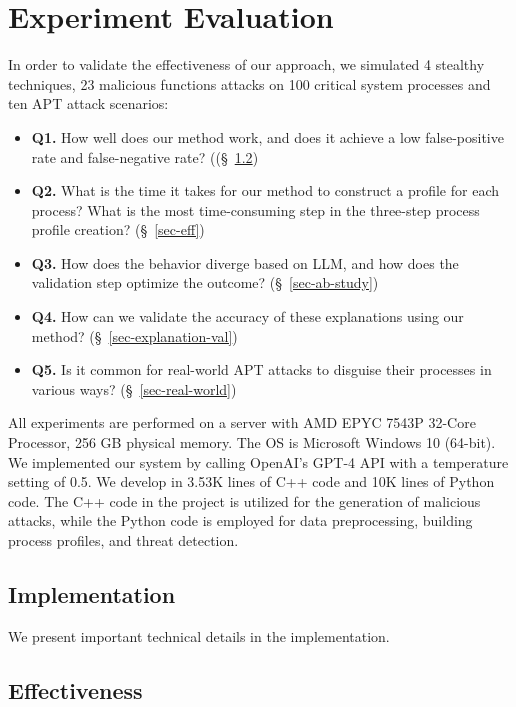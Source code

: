 \section{Experiment Evaluation}

In order to validate the effectiveness of our approach, we simulated 4 stealthy techniques, 23 malicious functions attacks on 100 critical system processes and ten APT attack scenarios:

\begin{itemize}
    \item \textbf{Q1.} How well does our method work, and does it achieve a low false-positive rate and false-negative rate? ((§~\ref{sec-effective})
    \item \textbf{Q2.} What is the time it takes for our method to construct a profile for each process? What is the most time-consuming step in the three-step process profile creation? (§~\ref{sec-eff})
    \item \textbf{Q3.} How does the behavior diverge based on LLM, and how does the validation step optimize the outcome? (§~\ref{sec-ab-study})
    \item \textbf{Q4.} How can we validate the accuracy of these explanations using our method? (§~\ref{sec-explanation-val})
    \item \textbf{Q5.} Is it common for real-world APT attacks to disguise their processes in various ways? (§~\ref{sec-real-world})
\end{itemize}
All experiments are performed on a server with AMD EPYC 7543P 32-Core Processor, 256 GB physical memory. The OS is Microsoft Windows 10 (64-bit).
We implemented our system by calling OpenAI's GPT-4 API with a temperature setting of 0.5.
We develop \tool in 3.53K lines of C++ code and 10K lines of Python code.
The C++ code in the project is utilized for the generation of malicious attacks, while the Python code is employed for data preprocessing, building process profiles, and threat detection.


\subsection{Implementation}
We present important technical details in the implementation.


\subsection{Effectiveness}
\label{sec-effective}

